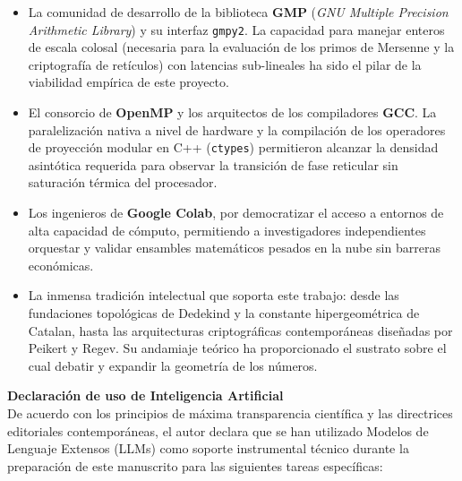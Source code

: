 \documentclass{article}
\numberwithin{equation}{section}
\theoremstyle{plain}
\theoremstyle{definition}
\begin{document}
\begin{itemize}
    \item La comunidad de desarrollo de la biblioteca \textbf{GMP} (\textit{GNU Multiple Precision Arithmetic Library}) y su interfaz \texttt{gmpy2}. La capacidad para manejar enteros de escala colosal (necesaria para la evaluación de los primos de Mersenne y la criptografía de retículos) con latencias sub-lineales ha sido el pilar de la viabilidad empírica de este proyecto.
    \item El consorcio de \textbf{OpenMP} y los arquitectos de los compiladores \textbf{GCC}. La paralelización nativa a nivel de hardware y la compilación de los operadores de proyección modular en C++ (\texttt{ctypes}) permitieron alcanzar la densidad asintótica requerida para observar la transición de fase reticular sin saturación térmica del procesador.
    \item Los ingenieros de \textbf{Google Colab}, por democratizar el acceso a entornos de alta capacidad de cómputo, permitiendo a investigadores independientes orquestar y validar ensambles matemáticos pesados en la nube sin barreras económicas.
    \item La inmensa tradición intelectual que soporta este trabajo: desde las fundaciones topológicas de Dedekind y la constante hipergeométrica de Catalan, hasta las arquitecturas criptográficas contemporáneas diseñadas por Peikert y Regev. Su andamiaje teórico ha proporcionado el sustrato sobre el cual debatir y expandir la geometría de los números.
\end{itemize}

\vspace{0.3cm}
\noindent \textbf{Declaración de uso de Inteligencia Artificial} \\
De acuerdo con los principios de máxima transparencia científica y las directrices editoriales contemporáneas, el autor declara que se han utilizado Modelos de Lenguaje Extensos (LLMs) como soporte instrumental técnico durante la preparación de este manuscrito para las siguientes tareas específicas:
\end{document}
